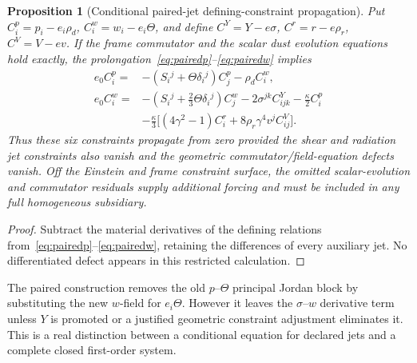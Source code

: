 \documentclass[11pt,a4paper]{article}
\newtheorem{proposition}[theorem]{Proposition}
\newcommand{\kap}{\kappa}
\begin{document}
\begin{proposition}[Conditional paired-jet defining-constraint propagation]\label{prop:pairedconstraints}
Put $C^p_i=p_i-e_i\rho_d$, $C^w_i=w_i-e_i\Theta$, and define $C^Y=Y-e\sigma$, $C^r=r-e\rho_r$, $C^V=V-ev$. If the frame commutator and the scalar dust evolution equations hold exactly, the prolongation~\eqref{eq:pairedp}--\eqref{eq:pairedw} implies
\begin{align}\label{eq:paireddefects}
e_0 C^p_i={}&-(S_i{}^j+\Theta\delta_i{}^j)C^p_j-\rho_d C^w_i,\\
e_0 C^w_i={}&-(S_i{}^j+\tfrac23\Theta\delta_i{}^j)C^w_j
-2\sigma^{jk}C^Y_{ijk}-\tfrac\kap2 C^p_i\nonumber\\
&-\tfrac\kap3\big[(4\gamma^2-1)C^r_i
+8\rho_r\gamma^4 v^j C^V_{ij}\big].\nonumber
\end{align}
Thus these six constraints propagate from zero \emph{provided} the shear and radiation jet constraints also vanish and the geometric commutator/field-equation defects vanish. Off the Einstein and frame constraint surface, the omitted scalar-evolution and commutator residuals supply additional forcing and must be included in any full homogeneous subsidiary.
\end{proposition}
\begin{proof}Subtract the material derivatives of the defining relations from~\eqref{eq:pairedp}--\eqref{eq:pairedw}, retaining the differences of every auxiliary jet. No differentiated defect appears in this restricted calculation.\end{proof}

The paired construction removes the old $p$--$\Theta$ principal Jordan block by substituting the new $w$-field for $e_i\Theta$. However it leaves the $\sigma$--$w$ derivative term unless $Y$ is promoted or a justified geometric constraint adjustment eliminates it. This is a real distinction between a conditional equation for declared jets and a complete closed first-order system.
\end{document}
